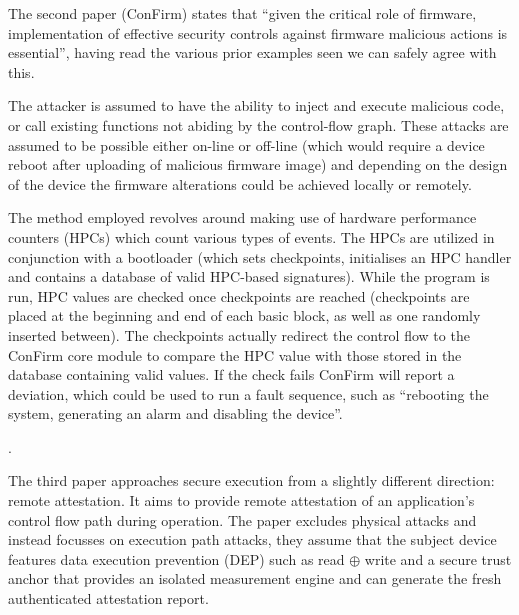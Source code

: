 
\fi

The second paper \cite{Wang2016} (ConFirm) states that ``given the critical role of firmware, implementation of effective security controls against firmware malicious actions is essential'', having read the various prior examples seen we can safely agree with this. 

The attacker is assumed to have the ability to inject and execute malicious code, or call existing functions not abiding by the control-flow graph. These attacks are assumed to be possible either on-line or off-line (which would require a device reboot after uploading of malicious firmware image) and depending on the design of the device the firmware alterations could be achieved locally or remotely.

The method employed revolves around making use of hardware performance counters (HPCs) which count various types of events. The HPCs are utilized in conjunction with a bootloader (which sets checkpoints, initialises an HPC handler and contains a database of valid HPC-based signatures). While the program is run, HPC values are checked once checkpoints are reached (checkpoints are placed at the beginning and end of each basic block, as well as one randomly inserted between). The checkpoints actually redirect the control flow to the ConFirm core module to compare the HPC value with those stored in the database containing valid values. If the check fails ConFirm will report a deviation, which could be used to run a fault sequence, such as ``rebooting the system, generating an alarm and disabling the device''.

\ifnotesincluded
{}.
\fi

The third paper \cite{Abera2016} approaches secure execution from a slightly different direction: remote attestation. It aims to provide remote attestation of an application's control flow path during operation. The paper excludes physical attacks and instead focusses on execution path attacks, they assume that the subject device features data execution prevention (DEP) such as read $\oplus$ write and a secure trust anchor that provides an isolated measurement engine and can generate the fresh authenticated attestation report.

